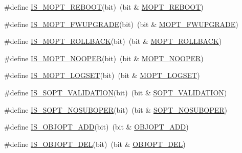 \begin{DoxyCompactItemize}
\#define \hyperlink{group__LIBHELP_gaf364d042ef26289927756c22b081cc51}{I\-S\-\_\-\-M\-O\-P\-T\-\_\-\-R\-E\-B\-O\-O\-T}(bit)~(bit \& \hyperlink{group__LIBHELP_gga0cdba030aaa0bd18b24dbf19b06877a0a6e7aba6cee631c9f873d54db477c7cd1}{M\-O\-P\-T\-\_\-\-R\-E\-B\-O\-O\-T})
\item 
\#define \hyperlink{group__LIBHELP_ga387ce232cf98493a8872cdfd92238327}{I\-S\-\_\-\-M\-O\-P\-T\-\_\-\-F\-W\-U\-P\-G\-R\-A\-D\-E}(bit)~(bit \& \hyperlink{group__LIBHELP_gga0cdba030aaa0bd18b24dbf19b06877a0abfc1a2664f39c1e872fad1d1d98230b8}{M\-O\-P\-T\-\_\-\-F\-W\-U\-P\-G\-R\-A\-D\-E})
\item 
\#define \hyperlink{group__LIBHELP_gae8f3761c6d539c9a01ed6d3d2ad62986}{I\-S\-\_\-\-M\-O\-P\-T\-\_\-\-R\-O\-L\-L\-B\-A\-C\-K}(bit)~(bit \& \hyperlink{group__LIBHELP_gga0cdba030aaa0bd18b24dbf19b06877a0ae4dd8f29bf2fe0dacabf9801d36cfc0f}{M\-O\-P\-T\-\_\-\-R\-O\-L\-L\-B\-A\-C\-K})
\item 
\#define \hyperlink{group__LIBHELP_gacd3e14e1fd731b23524e4cd7428ef1bb}{I\-S\-\_\-\-M\-O\-P\-T\-\_\-\-N\-O\-O\-P\-E\-R}(bit)~(bit \& \hyperlink{group__LIBHELP_gga0cdba030aaa0bd18b24dbf19b06877a0a3a04bfea3e66c08402950cc34095d6c7}{M\-O\-P\-T\-\_\-\-N\-O\-O\-P\-E\-R})
\item 
\#define \hyperlink{group__LIBHELP_ga58558fc449acb4f61e13a60120cf8aa2}{I\-S\-\_\-\-M\-O\-P\-T\-\_\-\-L\-O\-G\-S\-E\-T}(bit)~(bit \& \hyperlink{group__LIBHELP_gga0cdba030aaa0bd18b24dbf19b06877a0af808ed4b6160490c7d10ed88c9265303}{M\-O\-P\-T\-\_\-\-L\-O\-G\-S\-E\-T})
\item 
\#define \hyperlink{group__LIBHELP_gace0e914d4ef2ed9112831b50ec6380e9}{I\-S\-\_\-\-S\-O\-P\-T\-\_\-\-V\-A\-L\-I\-D\-A\-T\-I\-O\-N}(bit)~(bit \& \hyperlink{group__LIBHELP_gga26a2d765c9669d7cf62818f31a306f76abf85e6bbd86f9dff9fafb8b704f94dee}{S\-O\-P\-T\-\_\-\-V\-A\-L\-I\-D\-A\-T\-I\-O\-N})
\item 
\#define \hyperlink{group__LIBHELP_ga3609995a256464cd078bdf34bc4bc609}{I\-S\-\_\-\-S\-O\-P\-T\-\_\-\-N\-O\-S\-U\-B\-O\-P\-E\-R}(bit)~(bit \& \hyperlink{group__LIBHELP_gga26a2d765c9669d7cf62818f31a306f76ad8a3297ca7cf6f201aeebbe7a1786d44}{S\-O\-P\-T\-\_\-\-N\-O\-S\-U\-B\-O\-P\-E\-R})
\item 
\#define \hyperlink{group__LIBHELP_gabe168af9d6aead8e80b7f5c251075e04}{I\-S\-\_\-\-O\-B\-J\-O\-P\-T\-\_\-\-A\-D\-D}(bit)~(bit \& \hyperlink{group__LIBHELP_gga63865642181d8ac749852d657efc4bd8aaabb1855853c165aaee5ce4f600db21d}{O\-B\-J\-O\-P\-T\-\_\-\-A\-D\-D})
\item 
\#define \hyperlink{group__LIBHELP_ga37236721a9851ce31dc6de2f4ab0e8ef}{I\-S\-\_\-\-O\-B\-J\-O\-P\-T\-\_\-\-D\-E\-L}(bit)~(bit \& \hyperlink{group__LIBHELP_gga63865642181d8ac749852d657efc4bd8a53957d1b2b91ebb970527d1d7c86bbba}{O\-B\-J\-O\-P\-T\-\_\-\-D\-E\-L})

\end{DoxyCompactItemize}
